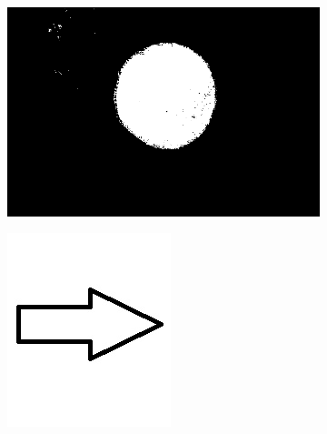 \documentclass{article}
\begin{document}
\begin{figure}[H]
\begin{subfigure}{.37\textwidth}
  \centering
  \includegraphics[width=0.97\linewidth]{_Figures/raw_data_4_binary.png}
  \caption{}
  \label{fig:raw_4}
\end{subfigure}%
\begin{subfigure}{.09\textwidth}
  \centering
  \includegraphics[width=0.97\linewidth]{_Figures/leftrightarrow.jpg}

\end{subfigure}
\end{figure}
\end{document}

